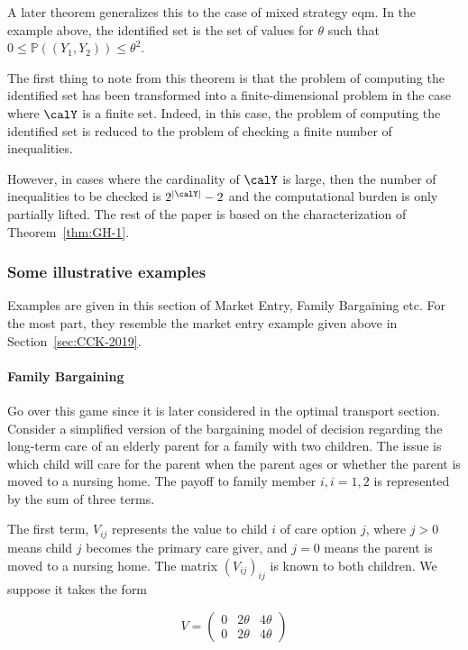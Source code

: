 A later theorem generalizes this to the case of mixed strategy eqm. In the example above, the identified set is the set of values for $\theta$ such that $0 \leq \mathbb{P}((Y_1,Y_2)) \leq \theta^2$.

The first thing to note from this theorem is that the problem of computing the identified set has been transformed into a finite-dimensional problem in the case where $\calY$ is a finite set. Indeed, in this case, the problem of computing the identified set is reduced to the problem of checking a finite number of inequalities.

However, in cases where the cardinality of $\calY$ is large, then the number of inequalities to be checked is $2^{|\calY|} - 2$ and the computational burden is only partially lifted. The rest of the paper is based on the characterization of Theorem~\ref{thm:GH-1}.
\subsubsection{Some illustrative examples}

Examples are given in this section of Market Entry, Family Bargaining etc. For the most part, they resemble the market entry example given above in Section~\ref{sec:CCK-2019}.

\paragraph{Family Bargaining}

Go over this game since it is later considered in the optimal transport section. Consider a simplified version of the bargaining model of decision regarding the long-term care of an elderly parent for a family with two children. The issue is which child will care for the parent when the parent ages or whether the parent is moved to a nursing home. The payoff to family member $i, i = 1,2$ is represented by the sum of three terms.

The first term, $V_{ij}$ represents the value to child $i$ of care option $j$, where $j > 0$ means child $j$ becomes the primary care giver, and $j= 0$ means the parent is moved to a nursing home. The matrix $(V_{ij})_{ij}$ is known to both children. We suppose it takes the form

\[V = \begin{pmatrix} 0 & 2\theta & 4\theta \\0 & 2\theta & 4\theta  \end{pmatrix}\]

